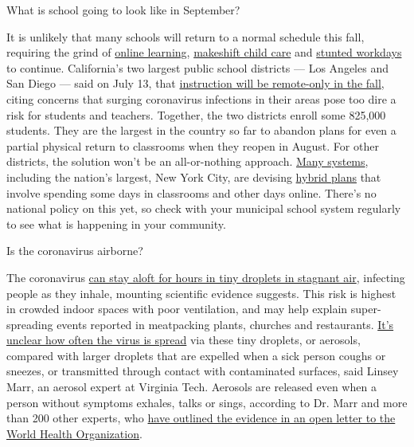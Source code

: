  What is school going to look like in September?

It is unlikely that many schools will return to a normal schedule this
fall, requiring the grind of
\href{https://www.nytimes3xbfgragh.onion/2020/06/05/us/coronavirus-education-lost-learning.html}{online
learning},
\href{https://www.nytimes3xbfgragh.onion/2020/05/29/us/coronavirus-child-care-centers.html}{makeshift
child care} and
\href{https://www.nytimes3xbfgragh.onion/2020/06/03/business/economy/coronavirus-working-women.html}{stunted
workdays} to continue. California's two largest public school districts
--- Los Angeles and San Diego --- said on July 13, that
\href{https://www.nytimes3xbfgragh.onion/2020/07/13/us/lausd-san-diego-school-reopening.html}{instruction
will be remote-only in the fall}, citing concerns that surging
coronavirus infections in their areas pose too dire a risk for students
and teachers. Together, the two districts enroll some 825,000 students.
They are the largest in the country so far to abandon plans for even a
partial physical return to classrooms when they reopen in August. For
other districts, the solution won't be an all-or-nothing approach.
\href{https://bioethics.jhu.edu/research-and-outreach/projects/eschool-initiative/school-policy-tracker/}{Many
systems}, including the nation's largest, New York City, are devising
\href{https://www.nytimes3xbfgragh.onion/2020/06/26/us/coronavirus-schools-reopen-fall.html}{hybrid
plans} that involve spending some days in classrooms and other days
online. There's no national policy on this yet, so check with your
municipal school system regularly to see what is happening in your
community.

 Is the coronavirus airborne?

The coronavirus
\href{https://www.nytimes3xbfgragh.onion/2020/07/04/health/239-experts-with-one-big-claim-the-coronavirus-is-airborne.html}{can
stay aloft for hours in tiny droplets in stagnant air}, infecting people
as they inhale, mounting scientific evidence suggests. This risk is
highest in crowded indoor spaces with poor ventilation, and may help
explain super-spreading events reported in meatpacking plants, churches
and restaurants.
\href{https://www.nytimes3xbfgragh.onion/2020/07/06/health/coronavirus-airborne-aerosols.html}{It's
unclear how often the virus is spread} via these tiny droplets, or
aerosols, compared with larger droplets that are expelled when a sick
person coughs or sneezes, or transmitted through contact with
contaminated surfaces, said Linsey Marr, an aerosol expert at Virginia
Tech. Aerosols are released even when a person without symptoms exhales,
talks or sings, according to Dr. Marr and more than 200 other experts,
who
\href{https://academic.oup.com/cid/article/doi/10.1093/cid/ciaa939/5867798}{have
outlined the evidence in an open letter to the World Health
Organization}.

